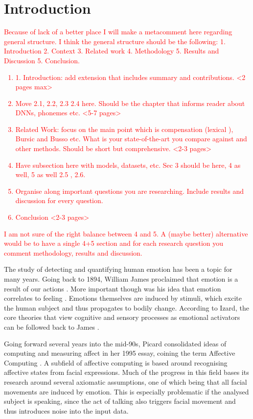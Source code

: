 \section{Introduction}
\textcolor{red}{Because of lack of a better place I will make a metacomment here regarding general structure. I think the general structure should be the following: 1. Introduction 2. Context 3. Related work 4. Methodology 5. Results and Discussion 5. Conclusion.
\begin{enumerate}
    \item 1. Introduction: add extension that includes summary and contributions. <2 pages max>
    \item Move 2.1, 2.2, 2.3 2.4 here. Should be the chapter that informs reader about DNNs, phonemes etc. <5-7 pages>
    \item  Related Work: focus on the main point which is compensation (lexical ), Bursic and Busso etc. What is your state-of-the-art you compare against and other methods. Should be short but comprehensive. <2-3 pages>
    \item  Have subsection here with models, datasets, etc. Sec 3 should be here, 4 as well, 5 as well 2.5 , 2.6. 
    \item  Organise along important questions you are researching. Include results and discussion for every question.
    \item  Conclusion <2-3 pages>
\end{enumerate}
I am not sure of the right balance between 4 and 5. A (maybe better) alternative would be to have a single 4+5 section and for each research question you comment methodology, results and discussion.
}

The study of detecting and quantifying human emotion has been a topic for many years. Going back to 1894, William James proclaimed that emotion is a result of our actions \cite{james1948emotion}. More important though was his idea that emotion correlates to feeling \cite{james2007principles}. Emotions themselves are induced by stimuli, which excite the human subject and thus propagates to bodily change. According to Izard, the core theories that view cognitive and sensory processes as emotional activators can be followed back to James \cite{izard1990substrates}.

Going forward several years into the mid-90s, Picard consolidated ideas of computing and measuring affect in her 1995 essay, coining the term Affective Computing \cite{picard2000affective}. A subfield of affective computing is based around recognising affective states from facial expressions. Much of the progress in this field bases its research around several axiomatic assumptions, one of which being that all facial movements are induced by emotion. This is especially problematic if the analysed subject is speaking, since the act of talking also triggers facial movement and thus introduces noise into the input data. 

